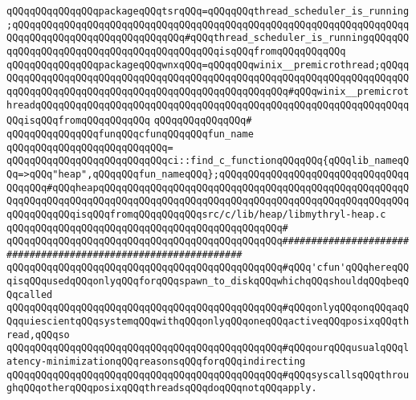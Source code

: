\verb|qQQqqQQqqQQqqQQqpackageqQQqtsrqQQq=qQQqqQQqthread_scheduler_is_running;qQQqqQQqqQQqqQQqqQQqqQQqqQQqqQQqqQQqqQQqqQQqqQQqqQQqqQQqqQQqqQQqqQQqqQQqqQQqqQQqqQQqqQQqqQQqqQQqqQQq#qQQqthread_scheduler_is_runningqQQqqQQqqQQqqQQqqQQqqQQqqQQqqQQqqQQqqQQqqQQqisqQQqfromqQQqqQQqqQQq|\newline
\verb|qQQqqQQqqQQqqQQqpackageqQQqwnxqQQq=qQQqqQQqwinix__premicrothread;qQQqqQQqqQQqqQQqqQQqqQQqqQQqqQQqqQQqqQQqqQQqqQQqqQQqqQQqqQQqqQQqqQQqqQQqqQQqqQQqqQQqqQQqqQQqqQQqqQQqqQQqqQQqqQQqqQQqqQQqqQQq#qQQqwinix__premicrothreadqQQqqQQqqQQqqQQqqQQqqQQqqQQqqQQqqQQqqQQqqQQqqQQqqQQqqQQqqQQqqQQqqQQqisqQQqfromqQQqqQQqqQQq|\newline
\verb|qQQqqQQqqQQqqQQq#|\newline
\verb|qQQqqQQqqQQqqQQqfunqQQqcfunqQQqqQQqfun_name|\newline
\verb|qQQqqQQqqQQqqQQqqQQqqQQqqQQq=|\newline
\verb|qQQqqQQqqQQqqQQqqQQqqQQqqQQqci::find_c_functionqQQqqQQq{qQQqlib_nameqQQq=>qQQq"heap",qQQqqQQqfun_nameqQQq};qQQqqQQqqQQqqQQqqQQqqQQqqQQqqQQqqQQqqQQq#qQQqheapqQQqqQQqqQQqqQQqqQQqqQQqqQQqqQQqqQQqqQQqqQQqqQQqqQQqqQQqqQQqqQQqqQQqqQQqqQQqqQQqqQQqqQQqqQQqqQQqqQQqqQQqqQQqqQQqqQQqqQQqqQQqqQQqqQQqqQQqisqQQqfromqQQqqQQqqQQqsrc/c/lib/heap/libmythryl-heap.c|\newline
\verb|qQQqqQQqqQQqqQQqqQQqqQQqqQQqqQQqqQQqqQQqqQQqqQQq#|\newline
\verb|qQQqqQQqqQQqqQQqqQQqqQQqqQQqqQQqqQQqqQQqqQQqqQQq###############################################################|\newline
\verb|qQQqqQQqqQQqqQQqqQQqqQQqqQQqqQQqqQQqqQQqqQQqqQQq#qQQq'cfun'qQQqhereqQQqisqQQqusedqQQqonlyqQQqforqQQqspawn_to_diskqQQqwhichqQQqshouldqQQqbeqQQqcalled|\newline
\verb|qQQqqQQqqQQqqQQqqQQqqQQqqQQqqQQqqQQqqQQqqQQqqQQq#qQQqonlyqQQqonqQQqaqQQqquiescientqQQqsystemqQQqwithqQQqonlyqQQqoneqQQqactiveqQQqposixqQQqthread,qQQqso|\newline
\verb|qQQqqQQqqQQqqQQqqQQqqQQqqQQqqQQqqQQqqQQqqQQqqQQq#qQQqourqQQqusualqQQqlatency-minimizationqQQqreasonsqQQqforqQQqindirecting|\newline
\verb|qQQqqQQqqQQqqQQqqQQqqQQqqQQqqQQqqQQqqQQqqQQqqQQq#qQQqsyscallsqQQqthroughqQQqotherqQQqposixqQQqthreadsqQQqdoqQQqnotqQQqapply.|\newline
